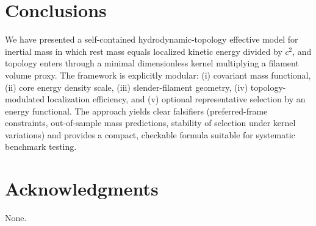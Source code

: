 \documentclass[11pt]{article}
\theoremstyle{definition}
\theoremstyle{plain}
\theoremstyle{remark}
\begin{document}
        \section{Conclusions}
        We have presented a self-contained hydrodynamic-topology effective model for inertial mass in which rest mass equals localized kinetic energy divided by $c^2$, and topology enters through a minimal dimensionless kernel multiplying a filament volume proxy. The framework is explicitly modular: (i) covariant mass functional, (ii) core energy density scale, (iii) slender-filament geometry, (iv) topology-modulated localization efficiency, and (v) optional representative selection by an energy functional. The approach yields clear falsifiers (preferred-frame constraints, out-of-sample mass predictions, stability of selection under kernel variations) and provides a compact, checkable formula suitable for systematic benchmark testing.

        \section*{Acknowledgments}
        None.
\end{document}

